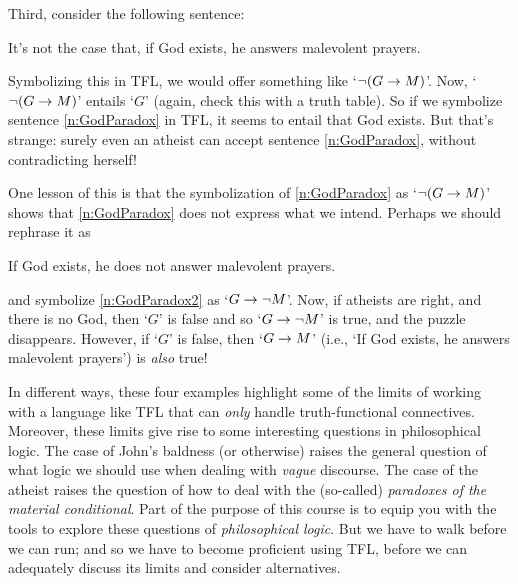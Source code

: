 Third, consider the following sentence:
	\begin{earg}
\setcounter{eargnum}{2}	
		\item\label{n:GodParadox}	It's not the case that, if God exists, he answers malevolent prayers.
	\end{earg}
        Symbolizing this in TFL, we would offer something like `${\neg} (G \rightarrow M)$'. Now, `${\neg} (G \rightarrow M)$' entails `$G$' (again, check this with a truth table). So if we symbolize sentence \ref{n:GodParadox} in TFL, it seems to entail that God exists. But that's strange: surely even an atheist can accept sentence \ref{n:GodParadox}, without contradicting herself!

        One lesson of this is that the symbolization of \ref{n:GodParadox} as `${\neg}(G \rightarrow M)$' shows that \ref{n:GodParadox} does not express what we intend. Perhaps we should rephrase it as
        	\begin{earg}
                  \setcounter{eargnum}{2}	
                \item\label{n:GodParadox2} If God exists, he does not answer malevolent prayers.
  \end{earg}
and symbolize \ref{n:GodParadox2} as `$G \rightarrow {\neg} M$'.  Now, if atheists are right, and there is no God, then `$G$' is false and so `$G \rightarrow {\neg} M$' is true, and the puzzle disappears. However, if `$G$' is false, then `$G \rightarrow M$' (i.e., `If God exists, he answers malevolent prayers') is \emph{also} true!
                
In different ways, these four examples highlight some of the limits of working with a language like TFL that can \emph{only} handle truth-functional connectives. Moreover, these limits give rise to some interesting questions in philosophical logic. The case of John's baldness (or otherwise) raises the general question of what logic we should use when dealing with \emph{vague} discourse. The case of the atheist raises the question of how to deal with the (so-called) \emph{paradoxes of the material conditional}. Part of the purpose of this course is to equip you with the tools to explore these questions of \emph{philosophical logic}. But we have to walk before we can run; and  so we have to become proficient using TFL, before we can adequately discuss its limits and consider alternatives. 


